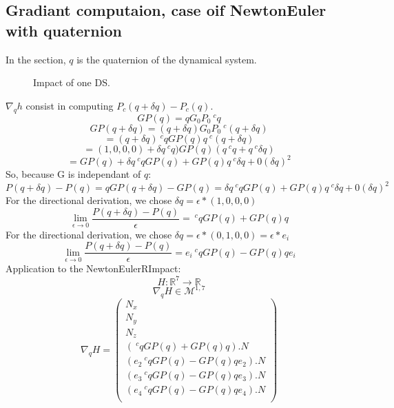 \subsection{Gradiant computaion, case oif NewtonEuler with quaternion}

In the section, $q$ is the quaternion of the dynamical system.

\begin{figure}[h]
  \centering
   
  
  
  \caption{Impact of one DS.}
  \label{figCase}
\end{figure}

$\nabla _q h$ consist in computing $P_c(q+\delta q)-P_c(q)$.
\[GP(q)=qG_0P_0~^cq\]
\[GP(q+\delta q)=(q+\delta q)G_0P_0~^c(q+\delta q)\]
\[=(q+\delta q)~^cqGP(q)q~^c(q+\delta q)\]
\[=(1,0,0,0)+\delta q~^cq)GP(q)(q~^cq+q~^c\delta q)\]
\[=GP(q)+\delta q~^cqGP(q) + GP(q)q~^c\delta q+0(\delta q)^2\]
So, because G is independant of $q$:
\[P(q+\delta q)-P(q)=qGP(q+\delta q)-GP(q)=\delta q~^cqGP(q) + GP(q)q~^c\delta q+0(\delta q)^2\]
For the directional derivation, we chose $\delta q = \epsilon * (1,0,0,0)$
\[\lim_{\epsilon \to 0}\frac{P(q+\delta q)-P(q)}{\epsilon}=~^cqGP(q) + GP(q)q\]
For the directional derivation, we chose $\delta q = \epsilon * (0,1,0,0)=\epsilon * e_i$
\[\lim_{\epsilon \to 0}\frac{P(q+\delta q)-P(q)}{\epsilon}=e_i~^cqGP(q) - GP(q)qe_i\]
Application to the NewtonEulerRImpact:
\[H:\mathbb{R}^7 \to \mathbb{R}\]
\[\nabla _q H \in \mathcal{M}^{1,7}\]
\[\nabla _q H =\left(\begin{array}{c} N_x\\N_y\\N_z\\
(~^cqGP(q) + GP(q)q).N\\
(e_2~^cqGP(q) - GP(q)qe_2).N\\
(e_3~^cqGP(q) - GP(q)qe_3).N\\
(e_4~^cqGP(q) - GP(q)qe_4).N\\
\end{array}\right)\]
